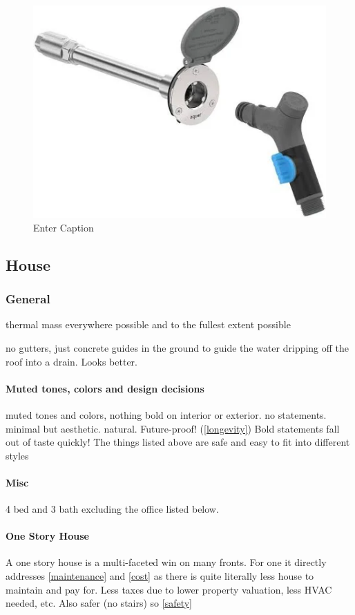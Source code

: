 \documentclass{article}
\begin{document}
\begin{figure}
    \centering
    \includegraphics[width=0.5\linewidth]{image.png}
    \caption{Enter Caption}
    \label{fig:enter-label}
\end{figure}

\subsection{House}
\subsubsection{General}
thermal mass everywhere possible and to the fullest extent possible

no gutters, just concrete guides in the ground to guide the water dripping off the roof into a drain. Looks better.

\paragraph{Muted tones, colors and design decisions}
muted tones and colors, nothing bold on interior or exterior. no statements. minimal but aesthetic. natural. Future-proof! (\ref{longevity}) Bold statements fall out of taste quickly! The things listed above are safe and easy to fit into different styles

\paragraph{Misc}
4 bed and 3 bath excluding the office listed below.

\paragraph{One Story House}
A one story house is a multi-faceted win on many fronts. For one it directly addresses \ref{maintenance} and \ref{cost} as there is quite literally less house to maintain and pay for. Less taxes due to lower property valuation, less HVAC needed, etc. Also safer (no stairs) so \ref{safety}
\end{document}
